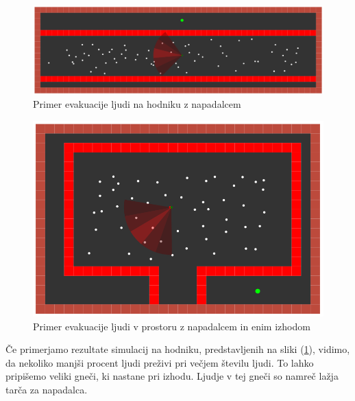 \documentclass[9pt]{pnas-new}
\begin{document}
\begin{figure}
	\centering
	\includegraphics[scale=0.333]{fig/hallway.png}
	\caption{Primer evakuacije ljudi na hodniku z napadalcem}
	\label{primer_hodnika_fig}
\end{figure}

\begin{figure}
	\centering
	\includegraphics[scale=0.3]{fig/room_with_one_exit.png}
	\caption{Primer evakuacije ljudi v prostoru z napadalcem in enim izhodom}
	\label{primer_sobe_fig}
\end{figure}

Če primerjamo rezultate simulacij na hodniku, predstavljenih na sliki (\ref{primer_hodnika_fig}), vidimo, da nekoliko manjši procent ljudi preživi pri večjem številu ljudi. To lahko pripišemo veliki gneči, ki
nastane pri izhodu. Ljudje v tej gneči so namreč lažja tarča za napadalca.
\end{document}
